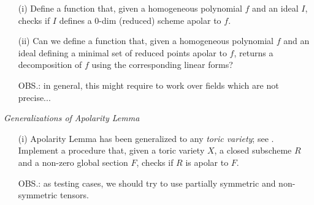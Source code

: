 \documentclass[11pt]{extarticle}
\theoremstyle{definition}
\theoremstyle{remark}
\theoremstyle{definition}
\begin{document}
\begin{itemize}
	\item[(i)]  Define a function that, given a homogeneous polynomial $f$ and an ideal $I$, checks if $I$ defines a $0$-dim (reduced) scheme apolar to $f$.
	
	\item[(ii)] Can we define a function that, given a homogeneous polynomial $f$ and an ideal defining a minimal set of reduced points apolar to $f$, returns a decomposition of $f$ using the corresponding linear forms?
	
	OBS.: in general, this might require to work over fields which are not precise... 
\end{itemize}
{\it Generalizations of Apolarity Lemma}
\begin{itemize}
\item[(i)] Apolarity Lemma has been generalized to any {\it toric variety}; see \cite{Gal16, Tei14}. Implement a procedure that, given a toric variety $X$, a closed subscheme $R$ and a non-zero global section $F$, checks if $R$ is apolar to $F$. 

OBS.: as testing cases, we should try to use partially symmetric and non-symmetric tensors.
\end{itemize}
\end{document}
